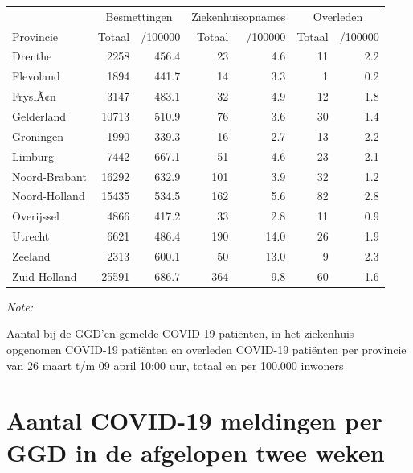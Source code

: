 \documentclass[
  english,
  man,floatsintext]{apa6}
\begin{document}
\begin{table}
\centering
\begin{threeparttable}
\begin{tabular}{lrrrrrr}
\toprule
\multicolumn{1}{c}{ } & \multicolumn{2}{c}{Besmettingen} & \multicolumn{2}{c}{Ziekenhuisopnames} & \multicolumn{2}{c}{Overleden} \\
\cmidrule(l{3pt}r{3pt}){2-3} \cmidrule(l{3pt}r{3pt}){4-5} \cmidrule(l{3pt}r{3pt}){6-7}
Provincie & Totaal & /100000 & Totaal & /100000 & Totaal & /100000\\
\midrule
Drenthe & 2258 & 456.4 & 23 & 4.6 & 11 & 2.2\\
Flevoland & 1894 & 441.7 & 14 & 3.3 & 1 & 0.2\\
FryslÃ¢n & 3147 & 483.1 & 32 & 4.9 & 12 & 1.8\\
Gelderland & 10713 & 510.9 & 76 & 3.6 & 30 & 1.4\\
Groningen & 1990 & 339.3 & 16 & 2.7 & 13 & 2.2\\
Limburg & 7442 & 667.1 & 51 & 4.6 & 23 & 2.1\\
Noord-Brabant & 16292 & 632.9 & 101 & 3.9 & 32 & 1.2\\
Noord-Holland & 15435 & 534.5 & 162 & 5.6 & 82 & 2.8\\
Overijssel & 4866 & 417.2 & 33 & 2.8 & 11 & 0.9\\
Utrecht & 6621 & 486.4 & 190 & 14.0 & 26 & 1.9\\
Zeeland & 2313 & 600.1 & 50 & 13.0 & 9 & 2.3\\
Zuid-Holland & 25591 & 686.7 & 364 & 9.8 & 60 & 1.6\\
\bottomrule
\end{tabular}
\begin{tablenotes}
\item \textit{Note: } 
\item Aantal bij de GGD’en gemelde COVID-19 patiënten, in het ziekenhuis opgenomen COVID-19 patiënten en overleden COVID-19 patiënten per provincie van 26 maart t/m 09 april 10:00 uur, totaal en per 100.000 inwoners
\end{tablenotes}
\end{threeparttable}
\end{table}

\newpage

\hypertarget{aantal-covid-19-meldingen-per-ggd-in-de-afgelopen-twee-weken}{%
\section{Aantal COVID-19 meldingen per GGD in de afgelopen twee weken}\label{aantal-covid-19-meldingen-per-ggd-in-de-afgelopen-twee-weken}}
\end{document}
